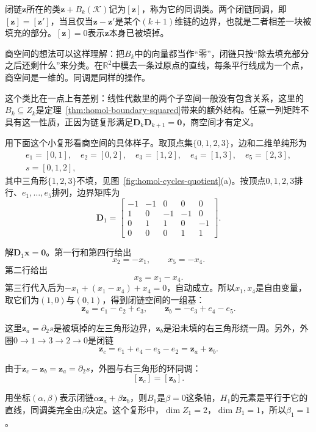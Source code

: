 闭链$\bm z$所在的类$\bm z+B_k(\mathcal K)$记为$[\bm z]$，称为它的同调类。两个闭链同调，即$[\bm z]=[\bm z']$，当且仅当$\bm z-\bm z'$是某个$(k+1)$维链的边界，也就是二者相差一块被填充的部分。$[\bm z]=0$表示$\bm z$本身已被填掉。

商空间的想法可以这样理解：把$B_k$中的向量都当作“零”，闭链只按“除去填充部分之后还剩什么”来分类。在$\mathbb R^2$中模去一条过原点的直线，每条平行线成为一个点，商空间是一维的。同调是同样的操作。

这个类比在一点上有差别：线性代数里的两个子空间一般没有包含关系，这里的$B_k\subseteq Z_k$是定理~\ref{thm:homol-boundary-squared}带来的额外结构。任意一列矩阵不具有这一性质，正因为链复形满足$\bm D_k\bm D_{k+1}=\bm 0$，商空间才有定义。

\begin{example}
\label{ex:homol-two-triangles-quotient}
用下面这个小复形看商空间的具体样子。取顶点集$\{0,1,2,3\}$，边和二维单纯形为
\[
 \begin{gathered}
 e_1=[0,1],\quad e_2=[0,2],\quad e_3=[1,2],\quad e_4=[1,3],\quad e_5=[2,3],\\
 s=[0,1,2],
 \end{gathered}
\]
其中三角形$\{1,2,3\}$不填，见图~\ref{fig:homol-cycles-quotient}(a)。按顶点$0,1,2,3$排行、$e_1,\ldots,e_5$排列，边界矩阵为
\[
 \bm D_1=\begin{bmatrix}
 -1&-1&0&0&0\\
 1&0&-1&-1&0\\
 0&1&1&0&-1\\
 0&0&0&1&1
 \end{bmatrix}.
\]

解$\bm D_1\bm x=\bm 0$。第一行和第四行给出
\[
 x_2=-x_1,\qquad x_5=-x_4.
\]
第二行给出
\[
 x_3=x_1-x_4.
\]
第三行代入后为$-x_1+(x_1-x_4)+x_4=0$，自动成立。所以$x_1,x_4$是自由变量，取它们为$(1,0)$与$(0,1)$，得到闭链空间的一组基：
\[
 \bm z_a=e_1-e_2+e_3,\qquad\bm z_b=-e_3+e_4-e_5.
\]

这里$\bm z_a=\partial_2s$是被填掉的左三角形边界，$\bm z_b$是沿未填的右三角形绕一周。另外，外圈$0\to1\to3\to2\to0$是闭链
\[
 \bm z_c=e_1+e_4-e_5-e_2=\bm z_a+\bm z_b.
\]

由于$\bm z_c-\bm z_b=\bm z_a=\partial_2s$，外圈与右三角形的环同调：
\[
 [\bm z_c]=[\bm z_b].
\]

用坐标$(\alpha,\beta)$表示闭链$\alpha\bm z_a+\beta\bm z_b$，则$B_1$是$\beta=0$这条轴，$H_1$的元素是平行于它的直线，同调类完全由$\beta$决定。这个复形中，$\dim Z_1=2$，$\dim B_1=1$，所以$\beta_1=1$。
\end{example}

